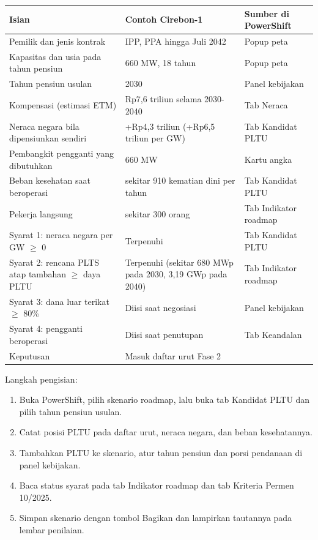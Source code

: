 \begin{table}[H]
\centering
\small
\begin{tabularx}{\textwidth}{L{5.2cm} Y L{2.6cm}}
\toprule
Isian & Contoh Cirebon-1 & Sumber di PowerShift \\
\midrule
Pemilik dan jenis kontrak & IPP, PPA hingga Juli 2042 & Popup peta \\
Kapasitas dan usia pada tahun pensiun & 660 MW, 18 tahun & Popup peta \\
Tahun pensiun usulan & 2030 & Panel kebijakan \\
Kompensasi (estimasi ETM) & Rp7,6 triliun selama 2030-2040 & Tab Neraca \\
Neraca negara bila dipensiunkan sendiri & +Rp4,3 triliun (+Rp6,5 triliun per GW) & Tab Kandidat PLTU \\
Pembangkit pengganti yang dibutuhkan & 660 MW & Kartu angka \\
Beban kesehatan saat beroperasi & sekitar 910 kematian dini per tahun & Tab Kandidat PLTU \\
Pekerja langsung & sekitar 300 orang & Tab Indikator roadmap \\
Syarat 1: neraca negara per GW $\geq$ 0 & Terpenuhi & Tab Kandidat PLTU \\
Syarat 2: rencana PLTS atap tambahan $\geq$ daya PLTU & Terpenuhi (sekitar 680 MWp pada 2030, 3,19 GWp pada 2040) & Tab Indikator roadmap \\
Syarat 3: dana luar terikat $\geq$ 80\% & Diisi saat negosiasi & Panel kebijakan \\
Syarat 4: pengganti beroperasi & Diisi saat penutupan & Tab Keandalan \\
Keputusan & Masuk daftar urut Fase 2 & \\
\bottomrule
\end{tabularx}
\end{table}

\noindent Langkah pengisian:
\begin{enumerate}
  \item Buka PowerShift, pilih skenario roadmap, lalu buka tab Kandidat PLTU dan pilih tahun pensiun usulan.
  \item Catat posisi PLTU pada daftar urut, neraca negara, dan beban kesehatannya.
  \item Tambahkan PLTU ke skenario, atur tahun pensiun dan porsi pendanaan di panel kebijakan.
  \item Baca status syarat pada tab Indikator roadmap dan tab Kriteria Permen 10/2025.
  \item Simpan skenario dengan tombol Bagikan dan lampirkan tautannya pada lembar penilaian.
\end{enumerate}

